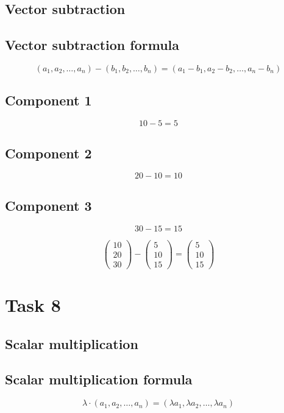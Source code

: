 \documentclass{article}
\begin{document}
\subsection*{Vector subtraction}
\subsection*{ \vspace{1em} Vector subtraction formula}
\[
(a_1, a_2, \dots, a_n) - (b_1, b_2, \dots, b_n) = (a_1 - b_1, a_2 - b_2, \dots, a_n - b_n)
\]
\subsection*{ \vspace{1em} Component 1}
\[
10 - 5 = 5
\]
\subsection*{ \vspace{1em} Component 2}
\[
20 - 10 = 10
\]
\subsection*{ \vspace{1em} Component 3}
\[
30 - 15 = 15
\]
\medskip

\[
\begin{pmatrix}10 \\ 20 \\ 30\end{pmatrix} - \begin{pmatrix}5 \\ 10 \\ 15\end{pmatrix} = \begin{pmatrix}5 \\ 10 \\ 15\end{pmatrix}
\]
\bigskip

\hrulefill
\bigskip

\section*{Task 8}

\subsection*{Scalar multiplication}
\subsection*{ \vspace{1em} Scalar multiplication formula}
\[
\lambda \cdot (a_1, a_2, \dots, a_n) = (\lambda a_1, \lambda a_2, \dots, \lambda a_n)
\]
\end{document}
